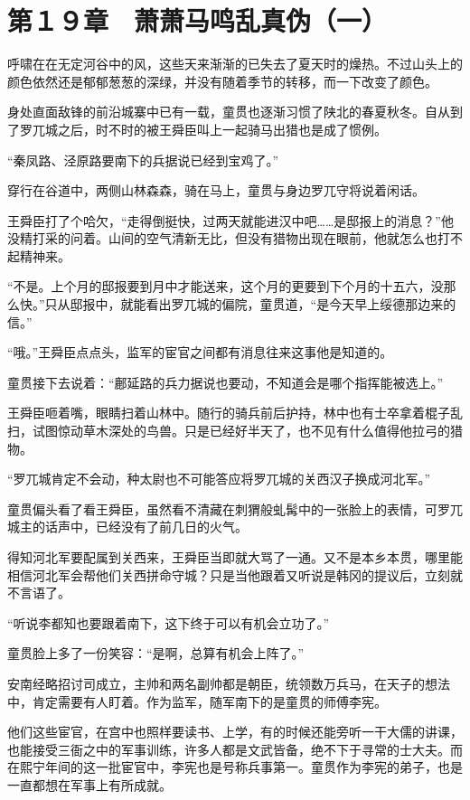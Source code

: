 \section{第１９章　萧萧马鸣乱真伪（一）}

呼啸在在无定河谷中的风，这些天来渐渐的已失去了夏天时的燥热。不过山头上的颜色依然还是郁郁葱葱的深绿，并没有随着季节的转移，而一下改变了颜色。

身处直面敌锋的前沿城寨中已有一载，童贯也逐渐习惯了陕北的春夏秋冬。自从到了罗兀城之后，时不时的被王舜臣叫上一起骑马出猎也是成了惯例。

“秦凤路、泾原路要南下的兵据说已经到宝鸡了。”

穿行在谷道中，两侧山林森森，骑在马上，童贯与身边罗兀守将说着闲话。

王舜臣打了个哈欠，“走得倒挺快，过两天就能进汉中吧……是邸报上的消息？”他没精打采的问着。山间的空气清新无比，但没有猎物出现在眼前，他就怎么也打不起精神来。

“不是。上个月的邸报要到月中才能送来，这个月的更要到下个月的十五六，没那么快。”只从邸报中，就能看出罗兀城的偏院，童贯道，“是今天早上绥德那边来的信。”

“哦。”王舜臣点点头，监军的宦官之间都有消息往来这事他是知道的。

童贯接下去说着：“鄜延路的兵力据说也要动，不知道会是哪个指挥能被选上。”

王舜臣咂着嘴，眼睛扫着山林中。随行的骑兵前后护持，林中也有士卒拿着棍子乱扫，试图惊动草木深处的鸟兽。只是已经好半天了，也不见有什么值得他拉弓的猎物。

“罗兀城肯定不会动，种太尉也不可能答应将罗兀城的关西汉子换成河北军。”

童贯偏头看了看王舜臣，虽然看不清藏在刺猬般虬髯中的一张脸上的表情，可罗兀城主的话声中，已经没有了前几日的火气。

得知河北军要配属到关西来，王舜臣当即就大骂了一通。又不是本乡本贯，哪里能相信河北军会帮他们关西拼命守城？只是当他跟着又听说是韩冈的提议后，立刻就不言语了。

“听说李都知也要跟着南下，这下终于可以有机会立功了。”

童贯脸上多了一份笑容：“是啊，总算有机会上阵了。”

安南经略招讨司成立，主帅和两名副帅都是朝臣，统领数万兵马，在天子的想法中，肯定需要有人盯着。作为监军，随军南下的是童贯的师傅李宪。

他们这些宦官，在宫中也照样要读书、上学，有的时候还能旁听一干大儒的讲课，也能接受三衙之中的军事训练，许多人都是文武皆备，绝不下于寻常的士大夫。而在熙宁年间的这一批宦官中，李宪也是号称兵事第一。童贯作为李宪的弟子，也是一直都想在军事上有所成就。

